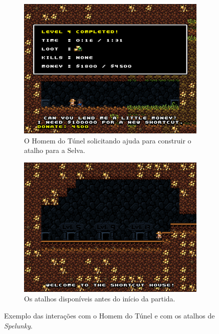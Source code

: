 \begin{figure}[htb!]
\centering
	\begin{subfigure}[b]{0.4\textwidth}
		\includegraphics[width=\textwidth]{fig/spelunky-tunnelman.pdf}
		\caption{O Homem do Túnel solicitando ajuda para construir o atalho para
		a Selva.}
		\label{fig:spelunky-tunnelman}
	\end{subfigure}
	\begin{subfigure}[b]{0.4\textwidth}
		\includegraphics[width=\textwidth]{fig/spelunky-shortcuts.pdf}
		\caption{Os atalhos disponíveis antes do início da partida.}
		\label{fig:spelunky-shortcuts}
	\end{subfigure}
	\caption{Exemplo das interações com o Homem do Túnel e com os atalhos de
	\textit{Spelunky}.}
	\label{fig:spelunky-shortcuts-example}
\end{figure}

